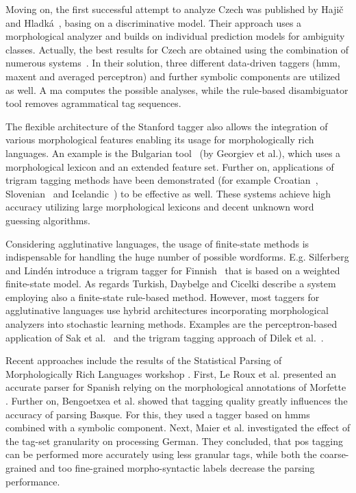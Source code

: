 Moving on, the first successful attempt to analyze Czech was published by Hajič and Hladká~\cite{Hajic1998a}, basing on a discriminative model.
Their approach uses a morphological analyzer and builds on individual prediction models for ambiguity classes.
Actually, the best results for Czech are obtained using the combination of numerous systems~\cite{Hajic2007}.
In their solution, three different data-driven taggers (\acrshort{hmm}, \acrlong{maxent} and averaged perceptron) and further symbolic components are utilized as well.
A \acrshort{ma} computes the possible analyses, while the rule-based disambiguator tool removes agrammatical tag sequences. 

The flexible architecture of the Stanford tagger \cite{Toutanova2003} also allows the integration of various morphological features enabling its usage for morphologically rich languages.
An example is the Bulgarian tool~\cite{Georgiev2012} (by Georgiev et al.), which uses a morphological lexicon and an extended feature set.
Further on, applications of trigram tagging methods \cite{Brants2000,Halacsy2007} have been demonstrated (for example Croatian~\cite{Agic2013}, Slovenian~\cite{Agic2013} and Icelandic~\cite{Loftsson2007}) to be effective as well.
These systems achieve high accuracy utilizing large morphological lexicons and decent unknown word guessing algorithms.

Considering agglutinative languages, the usage of finite-state methods is indispensable for handling the huge number of possible wordforms.
E.g. Silferberg and Lindén introduce a trigram tagger for Finnish~\cite{Silfverberg2011} that is based on a weighted finite-state model.
As regards Turkish, Daybelge and Cicelki describe a system~\cite{Daybelge2007} employing also a finite-state rule-based method.
However, most taggers for agglutinative languages use hybrid architectures incorporating morphological analyzers into stochastic learning methods.
Examples are the perceptron-based application of Sak et al.~\cite{Sak2007} and the trigram tagging approach of Dilek et al.~\cite{Hakkani-Tur2002}.

Recent approaches include the results of the Statistical Parsing of Morphologically Rich Languages workshop \cite{SPMRL:2010,SPMRL:2011,SPMRL:2012,SPMRL:2013}.
First, Le Roux et al. \cite{leroux2012} presented an accurate parser for Spanish relying on the morphological annotations of Morfette \cite{Chrupaa2008}.
Further on, Bengoetxea et al. \cite{bengoetxea2011testing} showed that tagging quality greatly influences the accuracy of parsing Basque. 
For this, they used a tagger based on \acrlong{hmm}s combined with a symbolic component.
Next, Maier et al. \cite{maier2014} investigated the effect of the tag-set granularity on processing German. 
They concluded, that \acrshort{pos} tagging can be performed more accurately using less granular tags, while both the coarse-grained and too fine-grained morpho-syntactic labels decrease the parsing performance.

